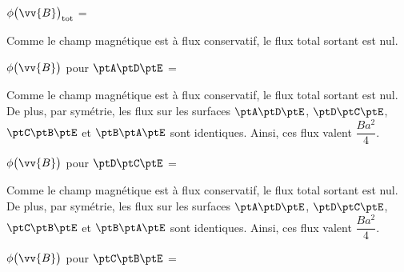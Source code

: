 \begin{enonce}
$\phi \big(\vv{B} \big)_\text{tot}$ =
\end{enonce}

\begin{corrige}
Comme le champ magnétique est à flux conservatif, le flux total sortant est nul.
\end{corrige}




\begin{enonce}
$\phi \big(\vv{B} \big)$ pour $\ptA\ptD\ptE$ =
\end{enonce}

\begin{corrige}
Comme le champ magnétique est à flux conservatif, le flux total sortant est nul. De plus, par symétrie, les flux sur les surfaces $\ptA\ptD\ptE$, $\ptD\ptC\ptE$, $\ptC\ptB\ptE$ et $\ptB\ptA\ptE$ sont identiques. Ainsi, ces flux valent $\dfrac{Ba^{2}}{4}$.
\end{corrige}




\begin{enonce}
$\phi \big(\vv{B} \big)$ pour $\ptD\ptC\ptE$ =
\end{enonce}

\begin{corrige}
Comme le champ magnétique est à flux conservatif, le flux total sortant est nul. De plus, par symétrie, les flux sur les surfaces $\ptA\ptD\ptE$, $\ptD\ptC\ptE$, $\ptC\ptB\ptE$ et $\ptB\ptA\ptE$ sont identiques. Ainsi, ces flux valent $\dfrac{Ba^{2}}{4}$.
\end{corrige}




\begin{enonce}
$\phi \big(\vv{B} \big)$ pour $\ptC\ptB\ptE$ =
\end{enonce}

